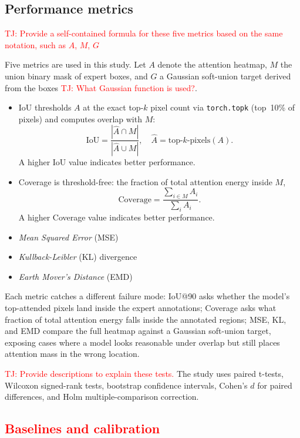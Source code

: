 \documentclass[lineno,pdflatex,sn-mathphys-num]{sn-jnl}%
\theoremstyle{thmstyleone}%
\theoremstyle{thmstyletwo}%
\theoremstyle{thmstylethree}%
\begin{document}
\subsection{Performance metrics}

\textcolor{red}{TJ: Provide a self-contained formula for these five metrics based on the same notation, such as $A$, $M$, $G$}

Five metrics are used in this study. Let $A$ denote the attention heatmap, $M$ the union binary mask of expert boxes, and $G$ a Gaussian soft-union target derived from the boxes \textcolor{red}{TJ: What Gaussian function is used?}.
\begin{itemize}
    \item IoU thresholds $A$ at the exact top-$k$ pixel count via
\texttt{torch.topk} (top~10\% of pixels) and computes overlap with $M$:
\begin{equation}
  \text{IoU} = \frac{|\hat{A} \cap M|}{|\hat{A} \cup M|}, \quad
  \hat{A} = \text{top-}k\text{-pixels}(A).
\end{equation}
A higher IoU value indicates better performance.
\item Coverage is threshold-free: the fraction of total attention energy
inside $M$,
\begin{equation}
  \text{Coverage} = \frac{\sum_{i \in M} A_i}{\sum_i A_i}.
\end{equation}
A higher Coverage value indicates better performance.
\item \textit{Mean Squared Error} (MSE)
\item \textit{Kullback-Leibler} (KL) divergence
\item \textit{Earth Mover's Distance} (EMD)
\end{itemize}
Each metric catches a different failure mode: IoU@90 asks whether the model's top-attended pixels land inside the expert annotations; Coverage asks what fraction of total attention energy falls inside the annotated regions; MSE, KL, and EMD compare the full heatmap against a Gaussian soft-union target, exposing cases where a model looks reasonable under overlap but still places attention mass in the wrong location.

\textcolor{red}{TJ: Provide descriptions to explain these tests.}
The study uses paired t-tests, Wilcoxon signed-rank tests, bootstrap confidence intervals, Cohen's $d$ for paired differences, and Holm multiple-comparison correction. 

\subsection{\textcolor{red}{Baselines and calibration}}
\end{document}
